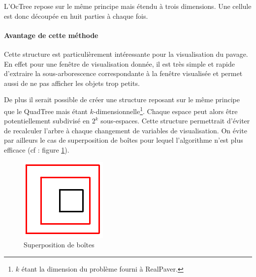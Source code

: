L'OcTree repose sur le même principe mais étendu à trois dimensions. Une cellule est donc découpée en huit parties à chaque fois.

\paragraph{Avantage de cette méthode}Cette structure est particulièrement intéressante pour la visualisation du pavage. En effet pour une fenêtre de visualisation donnée, il est très simple et rapide d'extraire la sous-arborescence correspondante à la fenêtre visualisée et permet aussi de ne pas afficher les objets trop petits. 

De plus il serait possible de créer une structure reposant sur le même principe que le QuadTree mais étant $k$-dimensionnelle\footnote{$k$ étant la dimension du problème fourni à RealPaver.}. Chaque espace peut alors être potentiellement subdivisé en $2^k$ sous-espaces. Cette structure permettrait d'éviter de recalculer l'arbre à chaque changement de variables de visualisation. On évite par ailleurs le cas de superposition de boîtes pour lequel l'algorithme n'est plus efficace (cf : figure \ref{fig:superpos}).
\begin{figure}[htbp]
\centering
\includegraphics[scale=0.30]{img/QT8}
\caption{Superposition de boîtes}
\label{fig:superpos}
\end{figure}

